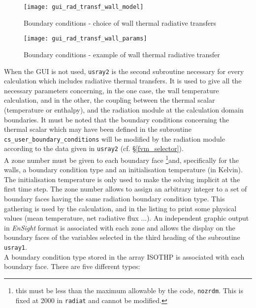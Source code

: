 {{\begin{figure}[ht]
\begin{center}
\texttt{[image: gui\_rad\_transf\_wall\_model]}
\caption{Boundary conditions - choice of wall thermal radiative transfers}
\label{fig:6_ray}
\end{center}
\end{figure}

\begin{figure}[ht]
\begin{center}
\texttt{[image: gui\_rad\_transf\_wall\_params]}
\caption{Boundary conditions - example of wall thermal radiative transfer}
\label{fig:7_ray}
\end{center}
\end{figure}

When the GUI is not used, \texttt{usray2} is the second subroutine necessary for every calculation which includes radiative thermal transfers. It is used to give all the
necessary parameters concerning, in the one case, the wall temperature
calculation, and in the other, the coupling between the thermal
scalar (temperature or enthalpy), and the radiation module at the
calculation domain boundaries. It must be noted that the boundary conditions
concerning the thermal scalar which may have been defined in the
subroutine \texttt{cs\_user\_boundary\_conditions} will be modified by the radiation module
according to the data given in \texttt{usray2} (cf. \S\ref{fvm_selector}).\\
A zone number must be given to each boundary face \footnote{this must be less
 than the maximum allowable by the code, \texttt{nozrdm}. This is fixed at 2000
 in \texttt{radiat} and cannot be modified.}and, specifically for
the walls, a boundary condition type and an initialisation temperature
(in Kelvin). The initialisation temperature is only used to make the
solving implicit at the first time step. The zone number allows to assign
an arbitrary integer to a set of boundary faces having the same
radiation boundary condition type. This gathering is used by the
calculation, and in the listing to print some physical values (mean
temperature, net radiative flux ...). An independent graphic output in
{\em EnSight} format is associated with each zone and allows the display on
the boundary faces of the variables selected in the third heading of the
subroutine \texttt{usray1}.\\
A boundary condition type stored in the array ISOTHP is associated with
each boundary face. There are five different types:

}}
